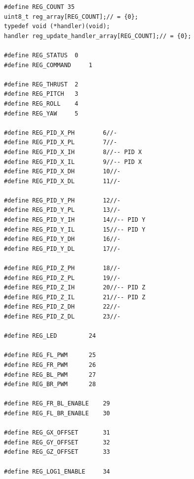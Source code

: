 \begin{lstlisting}
#define REG_COUNT 35
uint8_t reg_array[REG_COUNT];// = {0};
typedef void (*handler)(void);
handler reg_update_handler_array[REG_COUNT];// = {0};

#define REG_STATUS 	0
#define REG_COMMAND 	1

#define REG_THRUST	2
#define REG_PITCH	3
#define REG_ROLL	4
#define REG_YAW		5

#define REG_PID_X_PH		6//-
#define REG_PID_X_PL		7//-
#define REG_PID_X_IH		8//-- PID X
#define REG_PID_X_IL		9//-- PID X
#define REG_PID_X_DH		10//-
#define REG_PID_X_DL		11//-

#define REG_PID_Y_PH		12//-
#define REG_PID_Y_PL		13//-
#define REG_PID_Y_IH		14//-- PID Y
#define REG_PID_Y_IL		15//-- PID Y
#define REG_PID_Y_DH		16//-
#define REG_PID_Y_DL		17//-

#define REG_PID_Z_PH		18//-
#define REG_PID_Z_PL		19//-
#define REG_PID_Z_IH		20//-- PID Z
#define REG_PID_Z_IL		21//-- PID Z
#define REG_PID_Z_DH		22//-
#define REG_PID_Z_DL		23//-

#define REG_LED			24

#define REG_FL_PWM		25
#define REG_FR_PWM		26
#define REG_BL_PWM		27
#define REG_BR_PWM		28

#define REG_FR_BL_ENABLE	29
#define REG_FL_BR_ENABLE	30

#define REG_GX_OFFSET		31
#define REG_GY_OFFSET		32
#define REG_GZ_OFFSET		33

#define REG_LOG1_ENABLE		34
\end{lstlisting}

